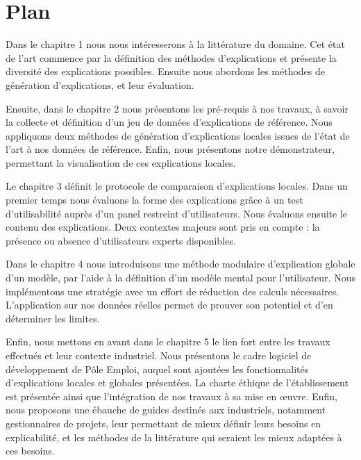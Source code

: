 \section*{Plan}

Dans le chapitre 1 nous nous intéresserons à la littérature du domaine. Cet état de l'art commence par la définition des méthodes d'explications et présente la diversité des explications possibles. Ensuite nous abordons les méthodes de génération d'explications, et leur évaluation.

Ensuite, dans le chapitre 2 nous présentons les pré-requis à nos travaux, à savoir la collecte et définition d'un jeu de données d'explications de référence. Nous appliquons deux méthodes de génération d'explications locales issues de l'état de l'art à nos données de référence. Enfin, nous présentons notre démonstrateur, permettant la visualisation de ces explications locales.

Le chapitre 3 définit le protocole de comparaison d'explications locales. Dans un premier temps nous évaluons la forme des explications grâce à un test d'utilisabilité auprès d'un panel restreint d'utilisateurs. Nous évaluons ensuite le contenu des explications. Deux contextes majeurs sont pris en compte : la présence ou absence d'utilisateurs experts disponibles.

Dans le chapitre 4 nous introduisons une méthode modulaire d'explication globale d'un modèle, par l'aide à la définition d'un modèle mental pour l'utilisateur. Nous implémentons une stratégie avec un effort de réduction des calculs nécessaires. L'application sur nos données réelles permet de prouver son potentiel et d'en déterminer les limites.

Enfin, nous mettons en avant dans le chapitre 5 le lien fort entre les travaux effectués et leur contexte industriel. Nous présentons le cadre logiciel de développement de Pôle Emploi, auquel sont ajoutées les fonctionnalités d'explications locales et globales présentées. La charte éthique de l'établissement est présentée ainsi que l'intégration de nos travaux à sa mise en œuvre. Enfin, nous proposons une ébauche de guides destinés aux industriels, notamment gestionnaires de projets, leur permettant de mieux définir leurs besoins en explicabilité, et les méthodes de la littérature qui seraient les mieux adaptées à ces besoins.

